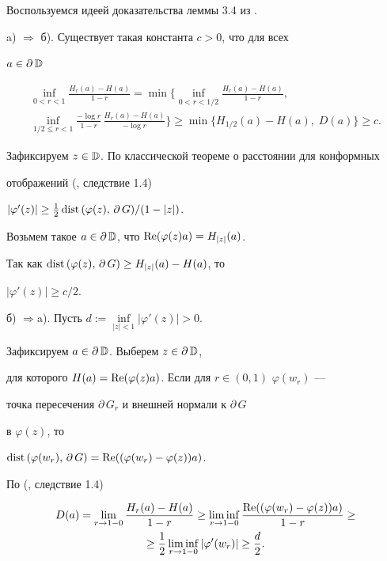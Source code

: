 \begin{pf} Воспользуемся идеей доказательства леммы 3.4 из \cite{Momm4}. 


 


a) $\Rightarrow $ б). Существует такая константа $c>0$, что для всех 


$a\in\partial\,\Bbb D$ 


\begin{multline*} 


\inf_{0<r<1}\frac{H_r(a)-H(a)}{1-r} =\min\biggl\{\inf_{0<r<1/2} 


\frac{H_r(a)-H(a)}{1-r},\\ 


\inf_{1/2\le r<1}\frac{-\log r}{1-r}\,\frac{H_r(a)-H(a)}{-\log r} 


\biggr\}\ge \min\{H_{1/2}(a)-H(a),\;D(a)\}\ge c. 


\end{multline*} 


 


Зафиксируем $z\in\Bbb D$. По классической теореме о расстоянии для конформных 


отображений (\cite{Pomm}, следствие 1.4) 


$|\varphi'(z)|\ge\frac12\text{\,dist\,}(\varphi(z),\,\partial\, G)/(1-|z|)$. 


Возьмем такое $a\in\partial\,\Bbb D$, что $\operatorname{Re}(\varphi(z)a)=H_{|z|}(a)$. 


Так как $\text{dist\,}(\varphi(z),\,\partial\, G)\ge H_{|z|}(a)-H(a)$, то 


$|\varphi'(z)|\ge c/2$. 


 


б) $\Rightarrow $a). Пусть $d:=\inf\limits_{|z|<1}|\varphi'(z)|>0$. 


Зафиксируем $a\in\partial\,\Bbb D$. Выберем $z\in\partial\,\Bbb D$, 


для которого $H(a)=\operatorname{Re}(\varphi(z)a)$. Если для $r\in(0,1)$ $\varphi(w_r)$ --- 


точка пересечения $\partial\, G_r$ и внешней нормали к $\partial\, G$ 


в $\varphi(z)$, то 


$\text{dist\,}(\varphi(w_r),\,\partial\, G)=\operatorname{Re}((\varphi(w_r)-\varphi(z))a)$. 


По (\cite{Pomm}, следствие 1.4) 


\begin{gather*} 


D(a)=\lim_{r\to 1-0}\frac{H_r(a)-H(a)}{1-r}\ge 


\liminf_{r\to 1-0}\frac{\R((\varphi(w_r)-\varphi(z))a)}{1-r}\ge \\ 


\ge \frac12\liminf_{r\to 1-0}|\varphi'(w_r)|\ge \frac{d}{2}. 


\end{gather*} 


\end{pf} 


